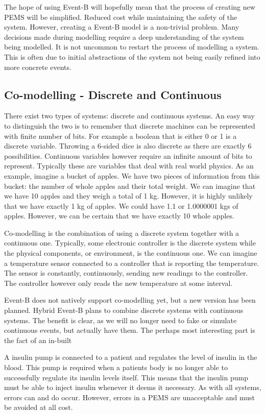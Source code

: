 The hope of using Event-B will hopefully mean that the process of creating new PEMS will be simplified. Reduced cost while maintaining the safety of the system. However, creating a Event-B model is a non-trivial problem. Many decisions made during modelling require a deep understanding of the system being modelled. It is not uncommon to restart the process of modelling a system. This is often due to initial abstractions of the system not being easily refined into more concrete events.

\subsection{Co-modelling - Discrete and Continuous}
There exist two types of systems: discrete and continuous systems. An easy way to distinguish the two is to remember that discrete machines can be represented with finite number of bits. For example a boolean that is either 0 or 1 is a discrete variable. Throwing a 6-sided dice is also discrete as there are exactly 6 possibilities. Continuous variables however require an infinite amount of bits to represent. Typically these are variables that deal with real world physics. As an example, imagine a bucket of apples. We have two pieces of information from this bucket: the number of whole apples and their total weight. We can imagine that we have 10 apples and they weigh a total of 1 kg. However, it is highly unlikely that we have exactly 1 kg of apples. We could have 1.1 or 1.0000001 kgs of apples. However, we can be certain that we have exactly 10 whole apples.

Co-modelling is the combination of using a discrete system together with a continuous one. Typically, some electronic controller is the discrete system while the physical components, or environment, is the continuous one. We can imagine a temperature sensor connected to a controller that is reporting the temperature. The sensor is constantly, continuously, sending new readings to the controller. The controller however only reads the new temperature at some interval. 

Event-B does not natively support co-modelling yet, but a new version has been planned. Hybrid Event-B plans to combine discrete systems with continuous systems. The benefit is clear, as we will no longer need to fake or simulate continuous events, but actually have them. The perhaps most interesting part is the fact of an in-built 

     

A insulin pump is connected to a patient and regulates the level of insulin in the blood. This pump is required when a patients body is no longer able to successfully regulate its insulin levels itself. This means that the insulin pump must be able to inject insulin whenever it deems it necessary. As with all systems, errors can and do occur. However, errors in a PEMS are unacceptable and must be avoided at all cost. 
